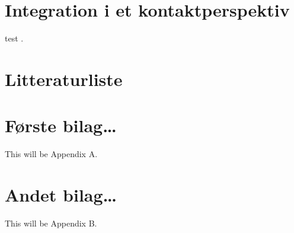 \documentclass[
]{book}
\begin{document}
\hypertarget{kap7}{%
\chapter{Integration i et kontaktperspektiv}\label{kap7}}

test \citep{xie2015}.

\hypertarget{litteraturliste}{%
\chapter*{Litteraturliste}\label{litteraturliste}}

\hypertarget{appendix-bilag}{%
\appendix}


\hypertarget{bilag1}{%
\chapter{Første bilag\ldots{}}\label{bilag1}}

This will be Appendix A.

\hypertarget{bilag2}{%
\chapter{Andet bilag\ldots{}}\label{bilag2}}

This will be Appendix B.

  
\end{document}
